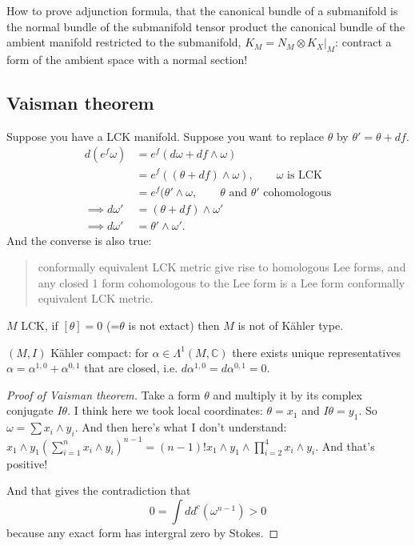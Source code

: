 How to prove adjunction formula, that the canonical bundle of a submanifold is the normal bundle of the submanifold tensor product the canonical bundle of the ambient manifold restricted to the submanifold, \(K_M=N_M \otimes K_X |_{M}\): contract a form of the ambient space with a normal section!

\subsection{Vaisman theorem}

Suppose you have a LCK manifold. Suppose you want to replace \(\theta\) by \(\theta'=\theta + df\).
\begin{align*}
d(e^f \omega )&= e^f( d \omega +df \wedge \omega)\\
&=e^f((\theta + df) \wedge \omega),\qquad \text{\(\omega\) is LCK} \\
&=e^f(\theta'\wedge\omega,\qquad \text{\(\theta\) and \(\theta'\) cohomologous} \\
\implies  d \omega'&=(\theta+ df) \wedge \omega'\\
\implies d \omega'&=\theta' \wedge \omega'.
\end{align*}
And the converse is also true:

\begin{quotation}
	conformally equivalent LCK metric give rise to homologous Lee forms, and any closed 1 form cohomologous to the Lee form is a Lee form conformally equivalent LCK metric.
\end{quotation}

\begin{thm}[Vaisman]\leavevmode
	\(M\) LCK, if \([\theta]=0\) (=\(\theta\) is not extact) then \(M\) is not of Kähler type. 
\end{thm}

\begin{remark}\leavevmode
\((M,I)\) Kähler compact: for \(\alpha \in \Lambda^{1}(M,\mathbb{C})\) there exists unique representatives \(\alpha=\alpha^{1,0}+\alpha^{0,1}\) that are closed, i.e.  \(d \alpha^{1,0}=d \alpha^{0,1}=0\).
\end{remark}

\begin{proof}[Proof of Vaisman theorem]\leavevmode
Take a form \(\theta\) and multiply it by its complex conjugate \(I \theta\). I think here we took local coordinates: \(\theta=x_1\) and \(I\theta=y_1\). So \(\omega = \sum x_i \wedge y_i\). And then here's what I don't understand:
\(x_1 \wedge y_1 \left(\sum_{i=1}^n x_i \wedge y_i\right)^{n-1}=(n-1)! x_1 \wedge y_1 \wedge \prod_{i=2}^4 x_i \wedge y_i\). And that's positive!

And that gives the contradiction that
\[0= \int d d^c (\omega^{n-1})>0\]
because any exact form has intergral zero by Stokes.
\end{proof}

